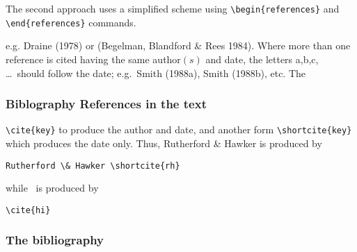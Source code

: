 The second approach uses a simplified scheme using \verb"\begin{references}" and
\verb"\end{references}" commands.

e.g. Draine (1978) or (Begelman, Blandford \& Rees 1984). Where more than one
reference is cited having the same author$(s)$ and date, the letters a,b,c,
\ldots\ should follow the date; e.g.\ Smith (1988a), Smith (1988b), etc. The

\subsubsection{Biblography References in the text}

\textendash{} \verb"\cite{key}" \textendash{} to produce the author and date,
and another form \textendash{} \verb"\shortcite{key}" \textendash{} which
produces the date only. Thus, Rutherford \& Hawker  is produced by
\begin{verbatim}
Rutherford \& Hawker \shortcite{rh}
\end{verbatim}
while~\cite{hi} is produced by
\begin{verbatim}
\cite{hi}
\end{verbatim}

\subsubsection{The bibliography}


